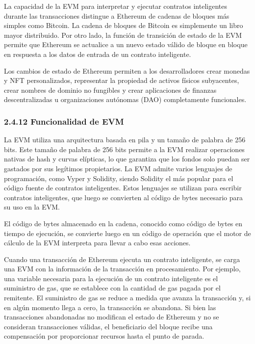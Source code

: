 \documentclass[12pt,a4paper]{article}
\begin{document}
La capacidad de la EVM para interpretar y ejecutar contratos inteligentes durante las
transacciones distingue a Ethereum de cadenas de bloques más simples como Bitcoin. La
cadena de bloques de Bitcoin es simplemente un libro mayor distribuido. Por otro lado, la
función de transición de estado de la EVM permite que Ethereum se actualice a un nuevo
estado válido de bloque en bloque en respuesta a los datos de entrada de un contrato
inteligente.

Los cambios de estado de Ethereum permiten a los desarrolladores crear monedas y NFT
personalizados, representar la propiedad de activos físicos subyacentes, crear nombres de
dominio no fungibles y crear aplicaciones de finanzas descentralizadas u organizaciones
autónomas (DAO) completamente funcionales.

\subsubsection*{2.4.12 Funcionalidad de EVM}

La EVM utiliza una arquitectura basada en pila y un tamaño de palabra de 256 bits. Este
tamaño de palabra de 256 bits permite a la EVM realizar operaciones nativas de hash y
curvas elípticas, lo que garantiza que los fondos solo puedan ser gastados por sus legítimos
propietarios. La EVM admite varios lenguajes de programación, como Vyper y Solidity,
siendo Solidity el más popular para el código fuente de contratos inteligentes. Estos
lenguajes se utilizan para escribir contratos inteligentes, que luego se convierten al código
de bytes necesario para su uso en la EVM.

El código de bytes almacenado en la cadena, conocido como código de bytes en tiempo de
ejecución, se convierte luego en un código de operación que el motor de cálculo de la EVM
interpreta para llevar a cabo esas acciones.

Cuando una transacción de Ethereum ejecuta un contrato inteligente, se carga una EVM
con la información de la transacción en procesamiento. Por ejemplo, una variable necesaria
para la ejecución de un contrato inteligente es el suministro de gas, que se establece con la
cantidad de gas pagada por el remitente. El suministro de gas se reduce a medida que
avanza la transacción y, si en algún momento llega a cero, la transacción se abandona. Si
bien las transacciones abandonadas no modifican el estado de Ethereum y no se
consideran transacciones válidas, el beneficiario del bloque recibe una compensación por
proporcionar recursos hasta el punto de parada.
\end{document}
